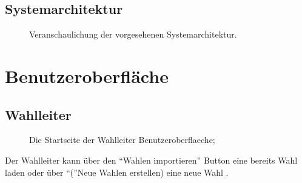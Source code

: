 \documentclass[parskip=full,11pt,twoside]{scrartcl}
\begin{document}
\subsection{Systemarchitektur}
\begin{figure}[H]
	\caption{\label{fig:sysArch}
		Veranschaulichung der vorgesehenen Systemarchitektur.
	}
\end{figure}

\section{Benutzeroberfläche}

\subsection{Wahlleiter}

\begin{figure}[H]
	\caption{\label{fig:wlltr-start}
		Die Startseite der \gls{Wahlleiter} \gls{Benutzeroberflaeche};
	}
\end{figure}
Der \gls{Wahlleiter} kann über den \enquote{Wahlen importieren} Button eine bereits  \gls{Wahl} laden oder über \enquote(Neue Wahlen erstellen) eine neue Wahl . 
\end{document}
